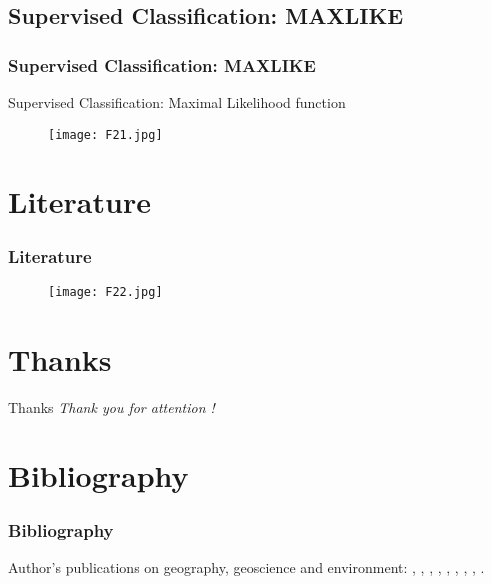 \documentclass[pdflatex,compress,8pt,
	xcolor={dvipsnames,dvipsnames,svgnames,x11names,table},
	hyperref={
	breaklinks = true, 
	pdfauthor={Lemenkova Polina}, 
	pdfsubject={Preentation}, 
	pdfcreator={Lemenkova Polina}, 
	pdfproducer={Lemenkova Polina}, 
	citecolor=NavyBlue, 
	urlbordercolor=cyan,
	urlcolor = NavyBlue, 
	breaklinks = true}]{beamer}
\begin{document}
\subsection{Supervised Classification: MAXLIKE}
\begin{frame}\frametitle{Supervised Classification: MAXLIKE}
Supervised Classification: Maximal Likelihood function
\begin{figure}[H]
	\centering
		\texttt{[image: F21.jpg]}
\end{figure}
\end{frame}

\section{Literature}
\begin{frame}\frametitle{Literature}
\begin{figure}[H]
	\centering
		\texttt{[image: F22.jpg]}
\end{figure}
\end{frame}

\section{Thanks}
\begin{frame}{Thanks}
  	\centering \LARGE 
  	\emph{Thank you for attention !}\\
\end{frame}


\section{Bibliography}
\begin{frame}\frametitle{Bibliography}
\scriptsize{Author's publications on geography, geoscience and environment: \cite{Lemenkova2006e}, \cite{Lemenkova2006b}, \cite{Lemenkova2006a}, \cite{Lemenkova2007b}, \cite{Lemenkova2004a}, \cite{Lemenkova2008b},  \cite{Lemenkova2005b1}, \cite{Lemenkova2005a}, \cite{Lemenkova2002b}.}
\printbibliography[heading=none]
\end{frame}


\end{document}
